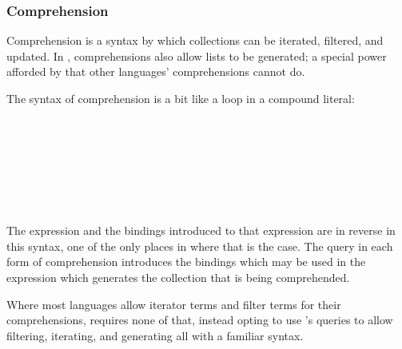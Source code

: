 \subsubsection{Comprehension}

Comprehension is a syntax by which collections can be iterated, filtered, and updated.
In \Trilogy{}, comprehensions also allow lists to be generated; a special power afforded
by \Law{} that other languages' comprehensions cannot do.

The syntax of comprehension is a bit like a  loop in a compound literal:

\begin{bnf*}
     \\
     \\
     \\
     \\
     \\
     \\
\end{bnf*}

The expression and the bindings introduced to that expression are in reverse in
this syntax, one of the only places in \Trilogy{} where that is the case. The
query in each form of comprehension introduces the bindings which may be used
in the expression which generates the collection that is being comprehended.

Where most languages allow iterator terms and filter terms for their comprehensions,
\Trilogy{} requires none of that, instead opting to use \Law{}'s queries to allow
filtering, iterating, and generating all with a familiar syntax.

\begin{prooftree}
\end{prooftree}

